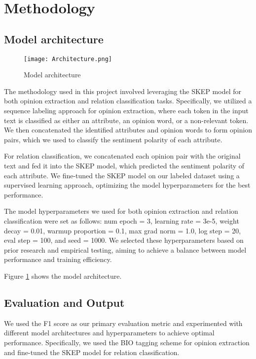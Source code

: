 \section{Methodology}

\subsection{Model architecture}

\begin{figure}[h]
    \centering
    \texttt{[image: Architecture.png]}
    \caption{Model architecture}
    \label{fig:Architecture}
\end{figure}

The methodology used in this project involved leveraging the SKEP model for both opinion extraction and relation classification tasks. Specifically, we utilized a sequence labeling approach for opinion extraction, where each token in the input text is classified as either an attribute, an opinion word, or a non-relevant token. We then concatenated the identified attributes and opinion words to form opinion pairs, which we used to classify the sentiment polarity of each attribute.

For relation classification, we concatenated each opinion pair with the original text and fed it into the SKEP model, which predicted the sentiment polarity of each attribute. We fine-tuned the SKEP model on our labeled dataset using a supervised learning approach, optimizing the model hyperparameters for the best performance.

The model hyperparameters we used for both opinion extraction and relation classification were set as follows: num epoch = 3, learning rate = 3e-5, weight decay = 0.01, warmup proportion = 0.1, max grad norm = 1.0, log step = 20, eval step = 100, and seed = 1000. We selected these hyperparameters based on prior research and empirical testing, aiming to achieve a balance between model performance and training efficiency.

Figure \ref{fig:Architecture} shows the model architecture. \cite{poswiata-2022-opi}

\subsection{Evaluation and Output}

We used the F1 score as our primary evaluation metric and experimented with different model architectures and hyperparameters to achieve optimal performance. Specifically, we used the BIO tagging scheme for opinion extraction and fine-tuned the SKEP model for relation classification.